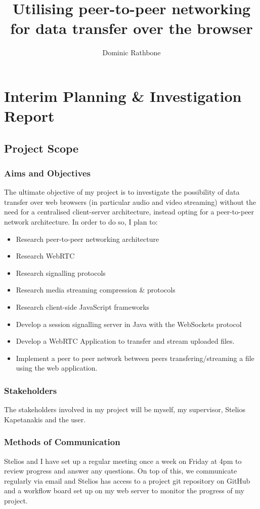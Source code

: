 \documentclass[]{report}
\title{Utilising peer-to-peer networking for data transfer over the browser}
\author{Dominic Rathbone}
\begin{document}
\maketitle
\tableofcontents
\listoftodos

\chapter{Interim Planning \& Investigation Report}
	\section{Project Scope}
		\subsection*{Aims and Objectives}
			The ultimate objective of my project is to investigate the possibility of data transfer over web browsers (in particular audio and video streaming) without the need for a centralised client-server architecture, instead opting for a peer-to-peer network architecture. In order to do so, I plan to:
			\begin{itemize}
				\item Research peer-to-peer networking architecture
				\item Research WebRTC
				\item Research signalling protocols
				\item Research media streaming compression \& protocols
				\item Research client-side JavaScript frameworks
				\item Develop a session signalling server in Java with the WebSockets protocol
				\item Develop a WebRTC Application to transfer and stream uploaded files.
				\item Implement a peer to peer network between peers transfering/streaming a file using the web application.
			\end{itemize}
		\subsection*{Stakeholders}
			The stakeholders involved in my project will be myself, my supervisor, Stelios Kapetanakis and the user.
		\subsection*{Methods of Communication}
			Stelios and I have set up a regular meeting once a week on Friday at 4pm to review progress and answer any questions. On top of this, we communicate regularly via email and Stelios has access to a project git repository on GitHub and a workflow board set up on my web server to monitor the progress of my project. 
			
\end{document}
